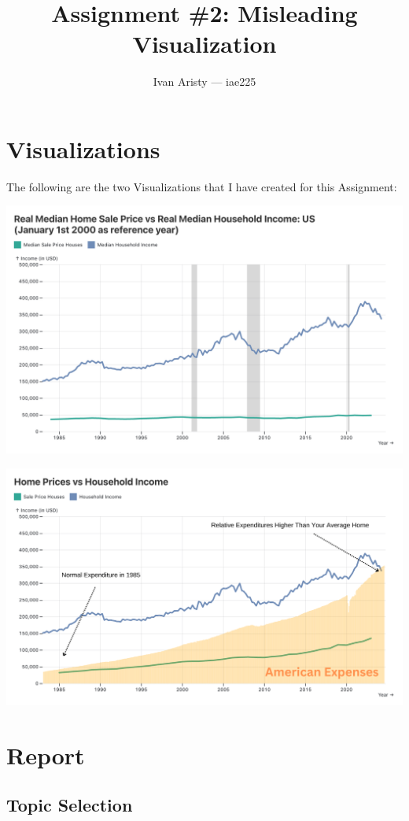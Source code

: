 \documentclass{article}
\title{Assignment \#2: Misleading Visualization}
\author{Ivan Aristy — iae225}
\begin{document}
  \maketitle %
  \thispagestyle{empty}

\section{Visualizations}
\label{sec:sec1}

The following are the two Visualizations that I have created for this Assignment:

\includegraphics[width=.75\textwidth]{figs/iter4.png} 

\includegraphics[width=.75\textwidth]{figs/missleading.png}

\newpage

\section{Report}
\label{sec:sec2}

\subsection{Topic Selection}
\label{subsec:topicSelection}
\end{document}
